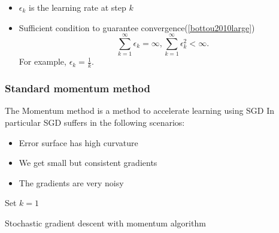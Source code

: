 \begin{refsection}
\begin{remark}\hfill
	\begin{itemize}
		\item $\epsilon_k$ is the learning rate at step $k$
		\item Sufficient condition to guarantee convergence(\autoref{bottou2010large})
		$$\sum_{k=1}^{\infty} \epsilon_k = \infty, \sum_{k=1}^{\infty}\epsilon_k^2 < \infty.$$
		For example, $\epsilon_k = \frac{1}{k}$.
	\end{itemize}	
\end{remark}

\subsubsection{Standard momentum method}

\begin{remark}
	The Momentum method is a method to accelerate learning
	using SGD
	In particular SGD suffers in the following scenarios:
	\begin{itemize}
		\item Error surface has high curvature
		\item We get small but consistent gradients
		\item The gradients are very noisy
	\end{itemize} 	
\end{remark}

\begin{algorithm}[H]
	\SetAlgoLined
	\KwIn{learning rate $\epsilon_k$, iniital model parameter $\theta$, momentum parameter $\alpha\in [0,1)$, initial velocity $v$}
	Set $k=1$ \\
	 
	\caption{Stochastic gradient descent with momentum algorithm}
\end{algorithm}


\end{refsection}
